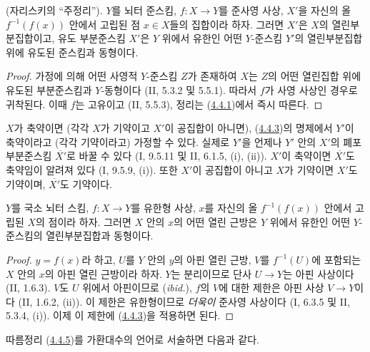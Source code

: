 \begin{theorem}[4.4.3]
\label{III.4.4.3-fr}
\textnormal{(자리스키의 “주정리”).}
$Y$를 뇌터 준스킴, $f:X\to Y$를 준사영 사상, $X'$을 자신의 올
$f^{-1}(f(x))$ 안에서 고립된 점 $x\in X$들의 집합이라 하자. 그러면
$X'$은 $X$의 열린부분집합이고, 유도 부분준스킴 $X'$은 $Y$ 위에서
유한인 어떤 $Y$-준스킴 $Y'$의 열린부분집합 위에 유도된 준스킴과
동형이다.
\end{theorem}

\begin{proof}
가정에 의해 어떤 사영적 $Y$-준스킴 $Z$가 존재하여 $X$는 $Z$의
어떤 열린집합 위에 유도된 부분준스킴과 $Y$-동형이다
(II, 5.3.2 및 5.5.1). 따라서 $f$가 사영 사상인 경우로 귀착된다.
이때 $f$는 고유이고 (II, 5.5.3), 정리는
(\hyperref[III.4.4.1-fr]{4.4.1})에서 즉시 따른다.
\end{proof}

\begin{remark}[4.4.4]
\label{III.4.4.4-fr}
$X$가 축약이면 (각각 $X$가 기약이고 $X'$이 공집합이 아니면),
(\hyperref[III.4.4.3-fr]{4.4.3})의 명제에서 $Y'$이 축약이라고
(각각 기약이라고) 가정할 수 있다. 실제로 $Y'$을 언제나 $Y'$ 안의
$X'$의 폐포 부분준스킴 $\overline{X'}$로 바꿀 수 있다
(I, 9.5.11 및 II, 6.1.5, (i), (ii)). $X'$이 축약이면
$\overline{X'}$도 축약임이 알려져 있다 (I, 9.5.9, (i)). 또한
$X'$이 공집합이 아니고 $X$가 기약이면 $X'$도 기약이며,
$\overline{X'}$도 기약이다.
\end{remark}

\begin{corollary}[4.4.5]
\label{III.4.4.5-fr}
$Y$를 국소 뇌터 스킴, $f:X\to Y$를 유한형 사상, $x$를 자신의 올
$f^{-1}(f(x))$ 안에서 고립된 $X$의 점이라 하자. 그러면 $X$ 안의
$x$의 어떤 열린 근방은 $Y$ 위에서 유한인 어떤 $Y$-준스킴의
열린부분집합과 동형이다.
\end{corollary}

\begin{proof}
$y=f(x)$라 하고, $U$를 $Y$ 안의 $y$의 아핀 열린 근방,
$V$를 $f^{-1}(U)$에 포함되는 $X$ 안의 $x$의 아핀 열린 근방이라
하자. $Y$는 분리이므로 단사 $U\to Y$는 아핀 사상이다 (II, 1.6.3).
$V$도 $U$ 위에서 아핀이므로 (\emph{ibid.}), $f$의 $V$에 대한
제한은 아핀 사상 $V\to Y$이다 (II, 1.6.2, (ii)). 이 제한은
유한형이므로 \emph{더욱이} 준사영 사상이다
(I, 6.3.5 및 II, 5.3.4, (i)). 이제 이 제한에
(\hyperref[III.4.4.3-fr]{4.4.3})을 적용하면 된다.
\end{proof}

따름정리 (\hyperref[III.4.4.5-fr]{4.4.5})를 가환대수의 언어로
서술하면 다음과 같다.

